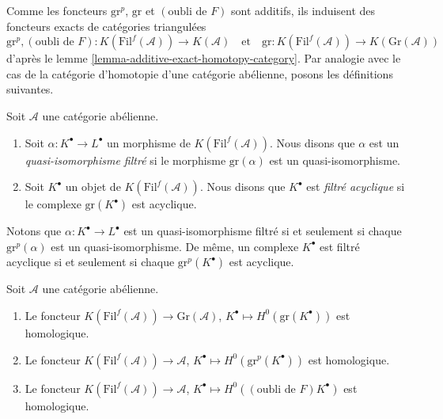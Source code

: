 \medskip\noindent
Comme les foncteurs $\text{gr}^p$, $\text{gr}$ et
$(\text{oubli de }F)$ sont additifs, ils induisent des foncteurs exacts de
catégories triangulées
$$
\text{gr}^p, (\text{oubli de }F) :
K(\text{Fil}^f(\mathcal{A}))
\to
K(\mathcal{A})
\quad\text{et}\quad
\text{gr} :
K(\text{Fil}^f(\mathcal{A}))
\to
K(\text{Gr}(\mathcal{A}))
$$
d'après le lemme \ref{lemma-additive-exact-homotopy-category}. Par analogie
avec le cas de la catégorie d'homotopie d'une catégorie abélienne, posons les
définitions suivantes.

\begin{definition}
\label{definition-filtered-acyclic}
Soit $\mathcal{A}$ une catégorie abélienne.
\begin{enumerate}
\item Soit $\alpha : K^\bullet \to L^\bullet$ un morphisme de
$K(\text{Fil}^f(\mathcal{A}))$. Nous disons que $\alpha$ est un
{\it quasi-isomorphisme filtré} si le morphisme $\text{gr}(\alpha)$ est un
quasi-isomorphisme.
\item Soit $K^\bullet$ un objet de $K(\text{Fil}^f(\mathcal{A}))$. Nous disons
que $K^\bullet$ est {\it filtré acyclique} si le complexe
$\text{gr}(K^\bullet)$ est acyclique.
\end{enumerate}
\end{definition}

\noindent
Notons que $\alpha : K^\bullet \to L^\bullet$ est un quasi-isomorphisme filtré
si et seulement si chaque $\text{gr}^p(\alpha)$ est un quasi-isomorphisme. De
même, un complexe $K^\bullet$ est filtré acyclique si et seulement si chaque
$\text{gr}^p(K^\bullet)$ est acyclique.

\begin{lemma}
\label{lemma-filtered-cohomology-homological}
Soit $\mathcal{A}$ une catégorie abélienne.
\begin{enumerate}
\item Le foncteur
$K(\text{Fil}^f(\mathcal{A})) \longrightarrow \text{Gr}(\mathcal{A})$,
$K^\bullet \longmapsto H^0(\text{gr}(K^\bullet))$ est homologique.
\item Le foncteur
$K(\text{Fil}^f(\mathcal{A})) \rightarrow \mathcal{A}$,
$K^\bullet \longmapsto H^0(\text{gr}^p(K^\bullet))$ est homologique.
\item Le foncteur
$K(\text{Fil}^f(\mathcal{A})) \longrightarrow \mathcal{A}$,
$K^\bullet \longmapsto H^0((\text{oubli de }F)K^\bullet)$ est homologique.
\end{enumerate}
\end{lemma}

